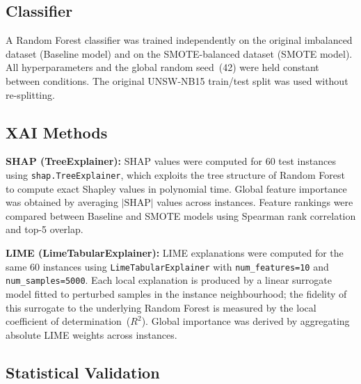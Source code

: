 \documentclass[conference,a4paper]{IEEEtran}
\newcommand{\SMOTE}{SMOTE\xspace}
\begin{document}
\subsection{Classifier}

A Random Forest \cite{breiman2001} classifier was trained independently on the
original imbalanced dataset (Baseline model) and on the \SMOTE-balanced dataset
(SMOTE model). All hyperparameters and the global random seed~(42) were held
constant between conditions. The original UNSW-NB15 train/test split was used
without re-splitting.

\subsection{XAI Methods}

\noindent\textbf{SHAP (TreeExplainer):} SHAP values \cite{lundberg2017,lundberg2020}
were computed for 60 test instances using \texttt{shap.TreeExplainer}, which
exploits the tree structure of Random Forest to compute exact Shapley values in
polynomial time. Global feature importance was obtained by averaging $|\text{SHAP}|$
values across instances. Feature rankings were compared between Baseline and SMOTE
models using Spearman rank correlation and top-5 overlap.

\smallskip
\noindent\textbf{LIME (LimeTabularExplainer):} LIME explanations \cite{ribeiro2016}
were computed for the same 60 instances using \texttt{LimeTabularExplainer} with
\texttt{num\_features=10} and \texttt{num\_samples=5000}. Each local explanation
is produced by a linear surrogate model fitted to perturbed samples in the instance
neighbourhood; the fidelity of this surrogate to the underlying Random Forest is
measured by the local coefficient of determination~($R^2$). Global importance was
derived by aggregating absolute LIME weights across instances.

\subsection{Statistical Validation}
\label{sec:stats}
\end{document}
